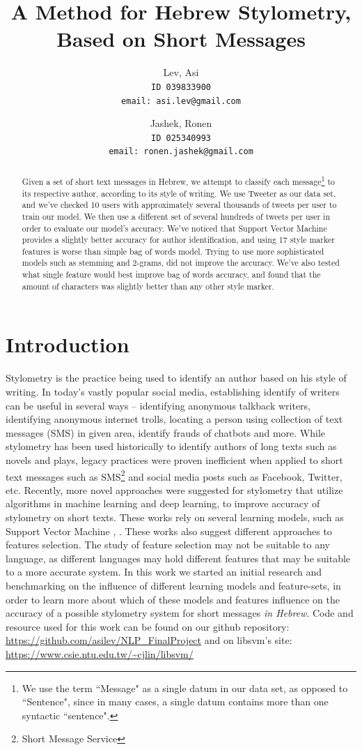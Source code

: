 \documentclass[a4paper]{article}
\author{Lev, Asi\\
	\texttt{ID 039833900}\\
	\texttt{email: asi.lev@gmail.com}
\and
	Jashek, Ronen\\
	\texttt{ID 025340993}\\
	\texttt{email: ronen.jashek@gmail.com}	
}
\title{A Method for Hebrew Stylometry, Based on Short Messages}
\date{}
\begin{document}
\maketitle
\begin{abstract}

Given a set of short text messages in Hebrew, we attempt to classify each message\footnote{We use the term ``Message" as a single datum in our data set, as opposed to ``Sentence", since in many cases, a single datum contains more than one syntactic ``sentence".} to its respective author, according to its style of writing.
We use Tweeter as our data set, and we've checked 10 users with approximately several thousands of tweets per user to train our model.
We then use a different set of several hundreds of tweets per user in order to evaluate our model's accuracy.
We've noticed that Support Vector Machine provides a slightly better accuracy for author identification, and using 17 style marker features is worse than simple bag of words model. Trying to use more sophisticated models such as stemming and 2-grams, did not improve the accuracy. We've also tested what single feature would best improve bag of words accuracy, and found that the amount of characters was slightly better than any other style marker.
\end{abstract}
\section{Introduction}

Stylometry is the practice being used to identify an author based on his style of writing. In today's vastly popular social media, establishing identify of writers can be useful in several ways – identifying anonymous talkback writers, identifying anonymous internet trolls, locating a person using collection of text messages (SMS) in given area, identify frauds of chatbots and more.
While stylometry has been used historically to identify authors of long texts such as novels and plays, legacy practices were proven inefficient when applied to short text messages such as SMS\footnote{Short Message Service} and social media posts such as Facebook, Twitter, etc. \cite{rachel}
Recently, more novel approaches were suggested for stylometry that utilize algorithms in machine learning and deep learning, to improve accuracy of stylometry on short texts.
These works rely on several learning models, such as Support Vector Machine \cite{rachel}, \cite{schwartz}.
These works also suggest different approaches to features selection. The study of feature selection may not be suitable to any language, as different languages may hold different features that may be suitable to a more accurate system.
In this work we started an initial research and benchmarking on the influence of different learning models and feature-sets, in order to learn more about which of these models and features influence on the accuracy of a possible stylometry system for short messages \emph{in Hebrew}.
Code and resource used for this work can be found on our github repository: \url{https://github.com/asilev/NLP\_FinalProject} and on libsvm's site: \url{https://www.csie.ntu.edu.tw/~cjlin/libsvm/} \cite{chang}
\end{document}
